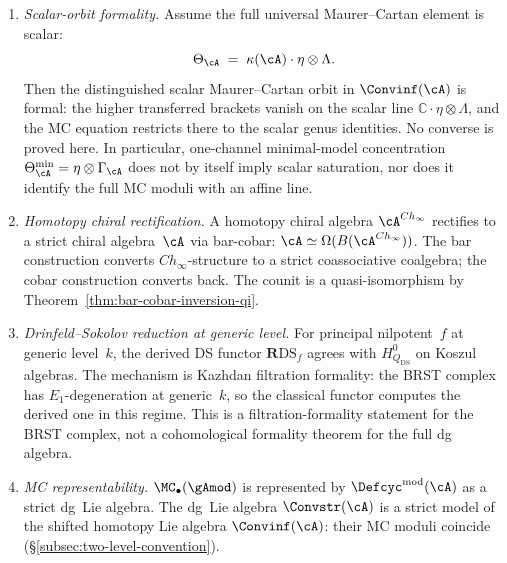 \begin{theorem}
\label{thm:rectification-meta}
\ClaimStatusProvedHere
{}
\begin{enumerate}[label=\textup{(\roman*)}]
\item \emph{Scalar-orbit formality.}
  Assume the full universal Maurer--Cartan element is scalar:
  \[
  \Theta_\cA
  \;=\;
  \kappa(\cA)\cdot \eta \otimes \Lambda.
  \]
  Then the distinguished scalar Maurer--Cartan orbit in
  $\Convinf(\cA)$ is formal: the higher transferred brackets
  vanish on the scalar line
  $\mathbb{C}\!\cdot\!\eta\otimes\Lambda$, and the MC equation
  restricts there to the scalar genus identities.
  No converse is proved here.  In particular, one-channel
  minimal-model concentration
  $\Theta_\cA^{\min}=\eta\otimes\Gamma_\cA$ does not by itself
  imply scalar saturation, nor does it identify the full MC moduli
  with an affine line.
\item \emph{Homotopy chiral rectification.}
  A homotopy chiral algebra $\cA^{Ch_\infty}$
  rectifies to a strict chiral algebra~$\cA$
  via bar-cobar:
  $\cA \simeq \Omega(B(\cA^{Ch_\infty}))$.
  The bar construction converts $Ch_\infty$-structure
  to a strict coassociative coalgebra; the cobar
  construction converts back.  The counit is a
  quasi-isomorphism by
  Theorem~\textup{\ref{thm:bar-cobar-inversion-qi}}.
\item \emph{Drinfeld--Sokolov reduction at generic level.}
  For principal nilpotent~$f$ at generic level~$k$,
  the derived DS functor $\mathbf{R}\mathrm{DS}_f$
  agrees with $H^0_{Q_{\mathrm{DS}}}$ on Koszul
  algebras.  The mechanism is Kazhdan filtration formality:
  the BRST complex has $E_1$-degeneration at generic~$k$, so the
  classical functor computes the derived one in this regime.
  This is a filtration-formality statement for the BRST complex,
  not a cohomological formality theorem for the full dg algebra.
\item \emph{MC representability.}
  $\MC_\bullet(\gAmod)$ is represented by
  $\Defcyc^{\mathrm{mod}}(\cA)$ as a strict dg~Lie
  algebra.  The dg~Lie algebra $\Convstr(\cA)$ is a
  strict model of the shifted homotopy Lie algebra
  $\Convinf(\cA)$: their MC moduli coincide
  \textup{(}\S\textup{\ref{subsec:two-level-convention}}\textup{)}.
\end{enumerate}
\end{theorem}

